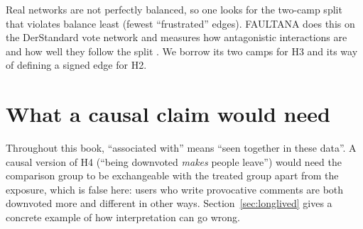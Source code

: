 Real networks are not perfectly balanced, so one looks for the two-camp split that violates balance least (fewest ``frustrated'' edges). FAULTANA does this on the DerStandard vote network and measures how antagonistic interactions are and how well they follow the split . We borrow its two camps for H3 and its way of defining a signed edge for H2.

\section{What a causal claim would need}
Throughout this book, ``associated with'' means ``seen together in these data''. A causal version of H4 (``being downvoted \emph{makes} people leave'') would need the comparison group to be exchangeable with the treated group apart from the exposure, which is false here: users who write provocative comments are both downvoted more and different in other ways. Section~\ref{sec:longlived} gives a concrete example of how interpretation can go wrong.
